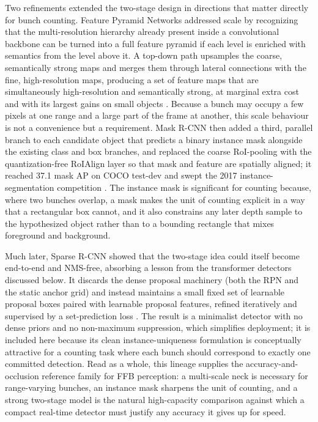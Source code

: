 Two refinements extended the two-stage design in directions that matter directly for bunch counting. Feature Pyramid Networks addressed scale by recognizing that the multi-resolution hierarchy already present inside a convolutional backbone can be turned into a full feature pyramid if each level is enriched with semantics from the level above it. A top-down path upsamples the coarse, semantically strong maps and merges them through lateral connections with the fine, high-resolution maps, producing a set of feature maps that are simultaneously high-resolution and semantically strong, at marginal extra cost and with its largest gains on small objects \cite{lin2017fpn}. Because a bunch may occupy a few pixels at one range and a large part of the frame at another, this scale behaviour is not a convenience but a requirement. Mask R-CNN then added a third, parallel branch to each candidate object that predicts a binary instance mask alongside the existing class and box branches, and replaced the coarse RoI-pooling with the quantization-free RoIAlign layer so that mask and feature are spatially aligned; it reached 37.1 mask AP on COCO test-dev and swept the 2017 instance-segmentation competition \cite{he2017maskrcnn}. The instance mask is significant for counting because, where two bunches overlap, a mask makes the unit of counting explicit in a way that a rectangular box cannot, and it also constrains any later depth sample to the hypothesized object rather than to a bounding rectangle that mixes foreground and background.

Much later, Sparse R-CNN showed that the two-stage idea could itself become end-to-end and NMS-free, absorbing a lesson from the transformer detectors discussed below. It discards the dense proposal machinery (both the RPN and the static anchor grid) and instead maintains a small fixed set of learnable proposal boxes paired with learnable proposal features, refined iteratively and supervised by a set-prediction loss \cite{sun2021sparsercnn}. The result is a minimalist detector with no dense priors and no non-maximum suppression, which simplifies deployment; it is included here because its clean instance-uniqueness formulation is conceptually attractive for a counting task where each bunch should correspond to exactly one committed detection. Read as a whole, this lineage supplies the accuracy-and-occlusion reference family for FFB perception: a multi-scale neck is necessary for range-varying bunches, an instance mask sharpens the unit of counting, and a strong two-stage model is the natural high-capacity comparison against which a compact real-time detector must justify any accuracy it gives up for speed.

